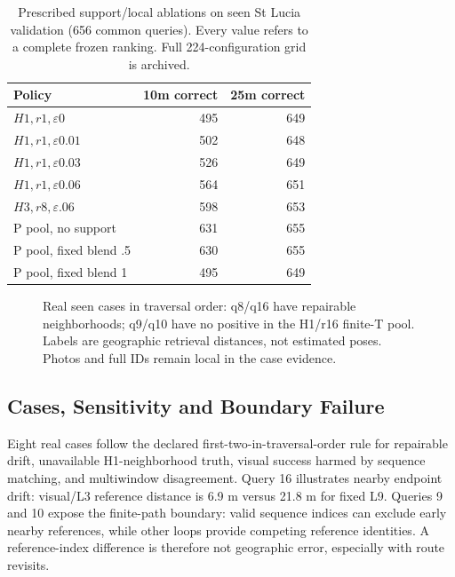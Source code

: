 \documentclass[conference]{IEEEtran}
\begin{document}
\begin{table}[t]\centering\small
\caption{Prescribed support/local ablations on seen St Lucia validation (656 common queries). Every value refers to a complete frozen ranking. Full 224-configuration grid is archived.}\label{tab:ablation}
\begin{tabular}{lrr}\toprule
Policy & 10m correct & 25m correct\\\midrule
$H1,r1,\varepsilon0$ & 495 & 649\\
$H1,r1,\varepsilon0.01$ & 502 & 648\\
$H1,r1,\varepsilon0.03$ & 526 & 649\\
$H1,r1,\varepsilon0.06$ & 564 & 651\\
$H3,r8,\varepsilon.06$ & 598 & 653\\
P pool, no support & 631 & 655\\
P pool, fixed blend .5 & 630 & 655\\
P pool, fixed blend 1 & 495 & 649\\
\bottomrule\end{tabular}\end{table}

\begin{figure}[t]\centering
{}
\caption{Real seen cases in traversal order: q8/q16 have repairable neighborhoods; q9/q10 have no positive in the H1/r16 finite-T pool. Labels are geographic retrieval distances, not estimated poses. Photos and full IDs remain local in the case evidence.}\label{fig:cases}\end{figure}

\subsection{Cases, Sensitivity and Boundary Failure}
Eight real cases follow the declared first-two-in-traversal-order rule for repairable drift, unavailable H1-neighborhood truth, visual success harmed by sequence matching, and multiwindow disagreement. Query 16 illustrates nearby endpoint drift: visual/L3 reference distance is 6.9 m versus 21.8 m for fixed L9. Queries 9 and 10 expose the finite-path boundary: valid sequence indices can exclude early nearby references, while other loops provide competing reference identities. A reference-index difference is therefore not geographic error, especially with route revisits.
\end{document}
